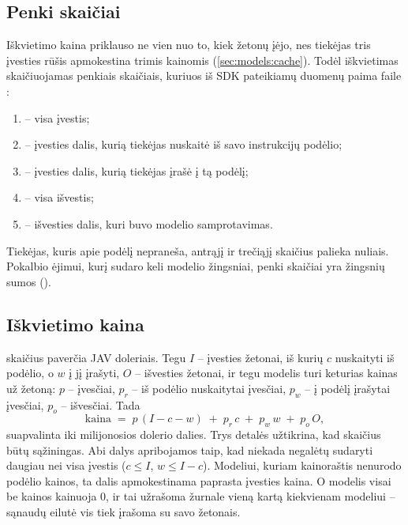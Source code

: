 \subsection{Penki skaičiai}

Iškvietimo kaina priklauso ne vien nuo to, kiek žetonų įėjo, nes tiekėjas tris įvesties rūšis
apmokestina trimis kainomis (\cref{sec:models:cache}). Todėl iškvietimas skaičiuojamas penkiais
skaičiais, kuriuos iš SDK pateikiamų duomenų paima  faile :

\begin{enumerate}
  \item {} -- visa įvestis;
  \item {} -- įvesties dalis, kurią tiekėjas nuskaitė iš savo
    instrukcijų podėlio;
  \item {} -- įvesties dalis, kurią tiekėjas įrašė į tą podėlį;
  \item {} -- visa išvestis;
  \item {} -- išvesties dalis, kuri buvo modelio samprotavimas.
\end{enumerate}

Tiekėjas, kuris apie podėlį nepraneša, antrąjį ir trečiąjį skaičius palieka nuliais. Pokalbio
ėjimui, kurį sudaro keli modelio žingsniai, penki skaičiai yra žingsnių sumos
().

\subsection{Iškvietimo kaina}

 skaičius paverčia JAV doleriais. Tegu $I$ -- įvesties žetonai, iš kurių $c$
nuskaityti iš podėlio, o $w$ į jį įrašyti, $O$ -- išvesties žetonai, ir tegu modelis turi
keturias kainas už žetoną: $p$ -- įvesčiai, $p_r$ -- iš podėlio nuskaitytai įvesčiai, $p_w$ --
į podėlį įrašytai įvesčiai, $p_o$ -- išvesčiai. Tada
\[
  \mathrm{kaina} \;=\; p\,(I - c - w) \;+\; p_r\,c \;+\; p_w\,w \;+\; p_o\,O ,
\]
suapvalinta iki milijonosios dolerio dalies. Trys detalės užtikrina, kad skaičius būtų sąžiningas. Abi dalys
apribojamos taip, kad niekada negalėtų sudaryti daugiau nei visa įvestis ($c \le I$,
$w \le I - c$). Modeliui, kuriam kainoraštis nenurodo podėlio kainos, ta dalis apmokestinama
paprasta įvesties kaina. O modelis visai be kainos kainuoja 0, ir tai užrašoma žurnale vieną
kartą kiekvienam modeliui -- sąnaudų eilutė vis tiek įrašoma su savo žetonais.

